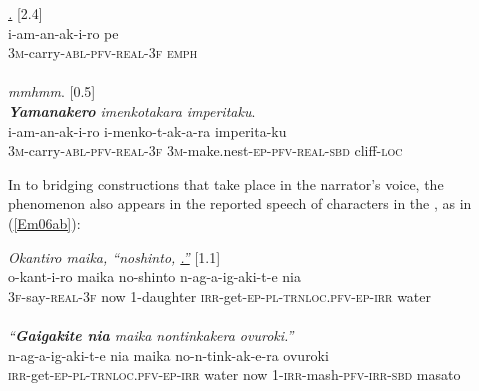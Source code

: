 \documentclass[output=paper]{LSP/langsci}
\begin{document}
\begin{exe}
\ex \label{Em05ab}
\begin{xlist}
\ex \label{Emex:05a}
\glt \textit{\underline{.} } [2.4]\\
\gll i-am-an-ak-i-ro pe\\
 \textsc{3m-}carry\textsc{-abl-pfv-real-3f} \textsc{emph}\\
\glt {}\\
\ex \label{Emex:05b}
\glt \textit{mmhmm}. [0.5]\\
\ex \label{Emex:05c}
\glt \textit{\textbf{Yamanakero} imenkotakara imperitaku}.\\
\gll i-am-an-ak-i-ro i-menko-t-ak-a-ra imperita-ku \\     	      
   \textsc{3m-}carry\textsc{-abl-pfv-real-3f} \textsc{3m-}make.nest\textsc{-ep-pfv-real-sbd} cliff\textsc{-loc}\\
\glt {}
\end{xlist}
\end{exe}



In  to bridging constructions that take place in the narrator’s voice, the phenomenon also appears in the reported speech of characters in the , as in (\ref{Em06ab}): 

\begin{exe}
\ex \label{Em06ab}
\begin{xlist}
\ex \label{Emex:06a}
\glt \textit{Okantiro maika, ``noshinto, \underline{.''}} [1.1]\\
\gll o-kant-i-ro maika no-shinto n-ag-a-ig-aki-t-e nia \\
 \textsc{3f-}say\textsc{-real-3f} now \textsc{1-}daughter \textsc{irr-}get\textsc{-ep-pl-trnloc.pfv-ep-irr} water\\
\glt {}\\
\ex \label{Emex:06b}
\glt \textit{``\textbf{Gaigakite nia} maika nontinkakera ovuroki.''}\\
\gll n-ag-a-ig-aki-t-e nia maika no-n-tink-ak-e-ra ovuroki\\     	      
   \textsc{irr-}get\textsc{-ep-pl-trnloc.pfv-ep-irr} water now \textsc{1-irr-}mash\textsc{-pfv-irr-sbd} masato\\
\glt {}
\end{xlist}
\end{exe}
\end{document}
